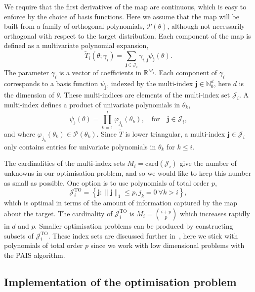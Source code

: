 \documentclass[final]{siamltex}
\begin{document}
We require that the first derivatives of the map are continuous, which is easy to enforce by the choice of basis functions. Here we assume that the map will be built from a family of orthogonal polynomials, $\mathcal{P}(\theta)$, although not necessarily orthogonal with respect to the target distribution. Each component of the map is defined as a multivariate polynomial expansion,
\begin{equation}\label{eq:map_defn}
	\tilde{T}_i(\theta; \gamma_i) = \sum\limits_{\mathbf{j}\in\mathcal{J}_i} \!
\gamma_{i,\mathbf{j}}\psi_\mathbf{j}(\theta).
\end{equation}
The parameter $\gamma_i$ is a vector of coefficients in $\mathbb{R}^{M_i}$. Each component of $\gamma_i$ corresponds to a basis function
$\psi_\mathbf{j}$, indexed by the multi-index $\mathbf{j} \in \mathbb{N}_0^d$, here $d$ is the dimension of
$\theta$. These multi-indices are elements of the multi-index set $\mathcal{J}_i$. A multi-index defines a product of univariate polynomials in $\theta_k$,
\[
	\psi_\mathbf{j}(\theta) = \prod\limits_{k=1}^i \! \varphi_{j_k}(\theta_k), \quad \text{for} \quad \mathbf{j} \in \mathcal{J}_i,
\]
and where $\varphi_{j_k}(\theta_k) \in \mathcal{P}(\theta_k)$. Since $\tilde{T}$ is lower triangular, a multi-index $\mathbf{j}\in\mathcal{J}_i$ only contains entries for univariate polynomials in $\theta_k$ for $k\leq i$.

The cardinalities of the multi-index sets $M_i = \text{card}(\mathcal{J}_i)$ give the number of unknowns in our
optimisation problem, and so we would like to keep this number as small as possible. One option is
to use polynomials of total order $p$,
\[
	\mathcal{J}_i^\text{TO} = \left\{\mathbf{j}:\|\mathbf{j}\|_1 \leq p, j_k = 0\ \forall k > i\right\},
\]
which is optimal in terms of the amount of information captured by the map about the target. The cardinality of $\mathcal{J}_i^\text{TO}$ is $M_i = {i+p \choose p}$ which increases rapidly in $d$ and $p$. Smaller optimisation problems can be produced by constructing subsets of $\mathcal{J}_i^\text{TO}$. These index sets are discussed further
in~\cite{parno2014transport}, here we stick with polynomials of total order $p$ since we work with low dimensional problems with the PAIS algorithm.

\subsection{Implementation of the optimisation problem}\label{sec:transport_implementation}
\end{document}
